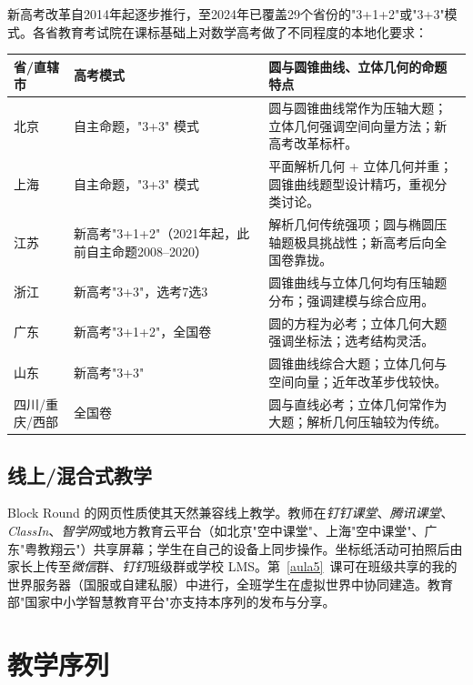 \documentclass[12pt,a4paper]{scrartcl}
\begin{document}
新高考改革自2014年起逐步推行，至2024年已覆盖29个省份的"3+1+2"或"3+3"模式。各省教育考试院在课标基础上对数学高考做了不同程度的本地化要求：

\begin{center}
\small
\begin{tabularx}{\textwidth}{@{}p{}p{}X@{}}
\toprule
\textbf{省/直辖市} & \textbf{高考模式} & \textbf{圆与圆锥曲线、立体几何的命题特点} \\
\midrule
北京 & 自主命题，"3+3" 模式 & 圆与圆锥曲线常作为压轴大题；立体几何强调空间向量方法；新高考改革标杆。 \\
\addlinespace[3pt]
上海 & 自主命题，"3+3" 模式 & 平面解析几何 + 立体几何并重；圆锥曲线题型设计精巧，重视分类讨论。 \\
\addlinespace[3pt]
江苏 & 新高考"3+1+2"（2021年起，此前自主命题2008--2020） & 解析几何传统强项；圆与椭圆压轴题极具挑战性；新高考后向全国卷靠拢。 \\
\addlinespace[3pt]
浙江 & 新高考"3+3"，选考7选3 & 圆锥曲线与立体几何均有压轴题分布；强调建模与综合应用。 \\
\addlinespace[3pt]
广东 & 新高考"3+1+2"，全国卷 & 圆的方程为必考；立体几何大题强调坐标法；选考结构灵活。 \\
\addlinespace[3pt]
山东 & 新高考"3+3" & 圆锥曲线综合大题；立体几何与空间向量；近年改革步伐较快。 \\
\addlinespace[3pt]
四川/重庆/西部 & 全国卷 & 圆与直线必考；立体几何常作为大题；解析几何压轴较为传统。 \\
\bottomrule
\end{tabularx}
\end{center}

\subsection{线上/混合式教学}
Block Round 的网页性质使其天然兼容线上教学。教师在\emph{钉钉课堂}、\emph{腾讯课堂}、\emph{ClassIn}、\emph{智学网}或地方教育云平台（如北京"空中课堂"、上海"空中课堂"、广东"粤教翔云"）共享屏幕；学生在自己的设备上同步操作。坐标纸活动可拍照后由家长上传至\emph{微信}群、\emph{钉钉}班级群或学校 LMS。第~\ref{aula5}~课可在班级共享的我的世界服务器（国服或自建私服）中进行，全班学生在虚拟世界中协同建造。教育部"国家中小学智慧教育平台"亦支持本序列的发布与分享。

\section{教学序列}\label{sec:sequencia}
\end{document}

